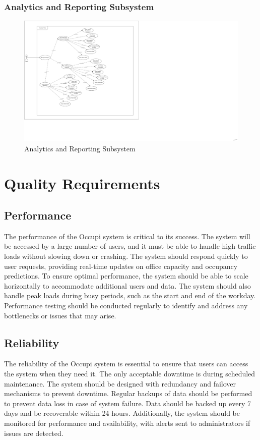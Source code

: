 \documentclass[11pt,a4paper]{article}
\begin{document}
\subsubsection*{Analytics and Reporting Subsystem}
\begin{figure}[htbp]
    \centering
    \includegraphics[width=1.0\textwidth]{Analytics and reporting.png}
    \caption{Analytics and Reporting Subsystem}
\end{figure}

\pagebreak

\section*{Quality Requirements}

\subsection*{Performance}
The performance of the Occupi system is critical to its success. The system will be accessed by a large number of users, and it must be able to handle high traffic loads without slowing down or crashing. The system should respond quickly to user requests, providing real-time updates on office capacity and occupancy predictions. To ensure optimal performance, the system should be able to scale horizontally to accommodate additional users and data. The system should also handle peak loads during busy periods, such as the start and end of the workday. Performance testing should be conducted regularly to identify and address any bottlenecks or issues that may arise.

\subsection*{Reliability}
The reliability of the Occupi system is essential to ensure that users can access the system when they need it. The only acceptable downtime is during scheduled maintenance. The system should be designed with redundancy and failover mechanisms to prevent downtime. Regular backups of data should be performed to prevent data loss in case of system failure. Data should be backed up every 7 days and be recoverable within 24 hours. Additionally, the system should be monitored for performance and availability, with alerts sent to administrators if issues are detected.
\end{document}
